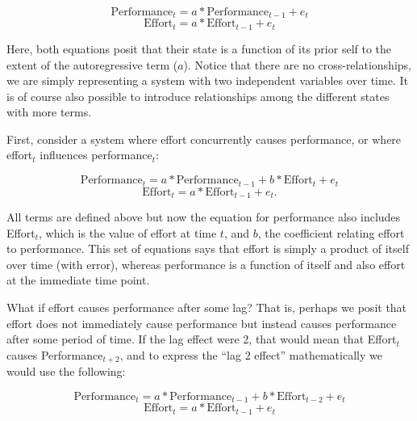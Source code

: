 \documentclass[english,,man]{apa6}
\begin{document}
\begin{equation}
\label{sysy}
\textrm{Performance}_{t} = a * \textrm{Performance}_{t - 1} + e_{t}
\end{equation}
\begin{equation}
\label{sysx}
\textrm{Effort}_{t} = a * \textrm{Effort}_{t - 1} + e_{t}
\end{equation}

\noindent Here, both equations posit that their state is a function of its prior self to the extent of the autoregressive term (\(a\)). Notice that there are no cross-relationships, we are simply representing a system with two independent variables over time. It is of course also possible to introduce relationships among the different states with more terms.

First, consider a system where effort concurrently causes performance, or where effort\(_t\) influences performance\(_t\):

\begin{equation}
\label{sysy2}
\textrm{Performance}_{t} = a * \textrm{Performance}_{t - 1} + b * \textrm{Effort}_{t} + e_{t}
\end{equation}
\begin{equation}
\label{sysx2}
\textrm{Effort}_{t} = a * \textrm{Effort}_{t - 1} + e_{t}.
\end{equation}

\noindent All terms are defined above but now the equation for performance also includes Effort\(_t\), which is the value of effort at time \(t\), and \(b\), the coefficient relating effort to performance. This set of equations says that effort is simply a product of itself over time (with error), whereas performance is a function of itself and also effort at the immediate time point.

What if effort causes performance after some lag? That is, perhaps we posit that effort does not immediately cause performance but instead causes performance after some period of time. If the lag effect were 2, that would mean that Effort\(_t\) causes Performance\(_{t+2}\), and to express the \enquote{lag 2 effect} mathematically we would use the following:

\begin{equation}
\label{sysy3}
\textrm{Performance}_{t} = a * \textrm{Performance}_{t - 1} + b * \textrm{Effort}_{t - 2} + e_{t}
\end{equation}
\begin{equation}
\label{sysx3}
\textrm{Effort}_{t} = a * \textrm{Effort}_{t - 1} + e_{t}
\end{equation}
\end{document}
